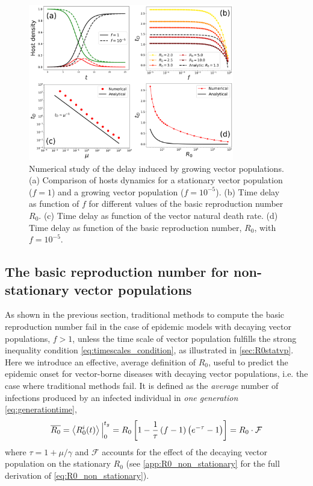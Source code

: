 \begin{figure}[H]
    \centering
    \includegraphics[width=0.8\textwidth]{Figures/delay.pdf}
    \caption{Numerical study of the delay induced by growing vector
    populations. (a) Comparison of hosts dynamics for a stationary vector
    population ($f=1$) and a growing vector population ($f=10^{-5}$). (b) Time
    delay as function of $f$ for different values of the basic reproduction
    number
    $R_0$. (c) Time delay as function of the vector natural death rate. (d)
    Time
    delay as function of the basic reproduction number, $R_0$, with
    $f=10^{-5}$.}
    \label{fig:delay}
\end{figure}

\subsection{The basic reproduction number for non-stationary vector
    populations}

As shown in the previous section, traditional methods to compute the basic
reproduction number fail in the case of epidemic models with decaying vector
populations, $f>1$, unless the time scale of vector population fulfills the
strong inequality condition \cref{eq:timescales_condition}, as illustrated in
\cref{sec:R0statvp}. Here we introduce an effective, average definition of
$R_0$, useful to predict the epidemic onset for vector-borne diseases with
decaying vector populations, i.e. the case where traditional methods fail. It
is defined as the \textit{average} number of infections produced by an infected
individual in \textit{one generation} \cref{eq:generationtime},
\begin{equation}\label{eq:R0_non_stationary}
    \overline{R_0}=\left<R_{0}^{i}(t)\right>\Big\rvert_{0}^{t_g}=
    R_0\left[1-\frac{1}{\tau}\left(f-1\right)
        \left(e^{-\tau}-1\right)\right]=R_0\cdot\mathcal{F}
\end{equation}
where $\tau=1+\mu/\gamma$ and $\mathcal{F}$ accounts for the effect of the
decaying vector population on the stationary $R_0$ (see
\cref{app:R0_non_stationary} for the full derivation of
\cref{eq:R0_non_stationary}).

